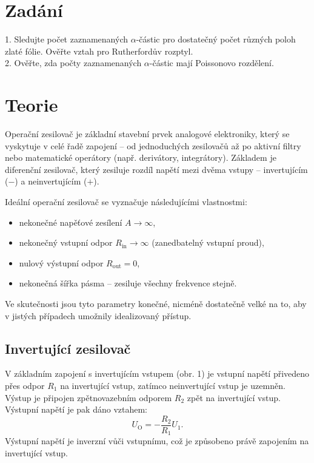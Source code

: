 \documentclass[czech,11pt,a4paper]{article}
\begin{document}
	\begin{multicols}{2}
		\section{Zadání}
		1. Sledujte počet zaznamenaných $\alpha$-částic pro dostatečný počet různých poloh zlaté fólie. Ověřte vztah pro Rutherfordův rozptyl.\\
		2. Ověřte, zda počty zaznamenaných $\alpha$-částic mají Poissonovo rozdělení.
		
		
		\section{Teorie}
		
		Operační zesilovač je základní stavební prvek analogové elektroniky, který se vyskytuje v celé řadě zapojení – od jednoduchých zesilovačů až po aktivní filtry nebo matematické operátory (např. derivátory, integrátory). Základem je diferenční zesilovač, který zesiluje rozdíl napětí mezi dvěma vstupy – invertujícím ($-$) a neinvertujícím ($+$).
		
		Ideální operační zesilovač se vyznačuje následujícími vlastnostmi:
		\begin{itemize}
			\item nekonečné napěťové zesílení $A \to \infty$,
			\item nekonečný vstupní odpor $R_\mathrm{in} \to \infty$ (zanedbatelný vstupní proud),
			\item nulový výstupní odpor $R_\mathrm{out} = 0$,
			\item nekonečná šířka pásma – zesiluje všechny frekvence stejně.
		\end{itemize}
		
		Ve skutečnosti jsou tyto parametry konečné, nicméně dostatečně velké na to, aby v jistých případech umožnily idealizovaný přístup.
		
		\subsection{Invertující zesilovač}
		
		V základním zapojení s invertujícím vstupem (obr. 1) je vstupní napětí přivedeno přes odpor $R_1$ na invertující vstup, zatímco neinvertující vstup je uzemněn. Výstup je připojen zpětnovazebním odporem $R_2$ zpět na invertující vstup. Výstupní napětí je pak dáno vztahem:
		\begin{equation}
			U_\mathrm{O} = -\frac{R_2}{R_1} U_1.
		\end{equation}
		Výstupní napětí je inverzní vůči vstupnímu, což je způsobeno právě zapojením na invertující vstup.
		

\end{multicols}
\end{document}
